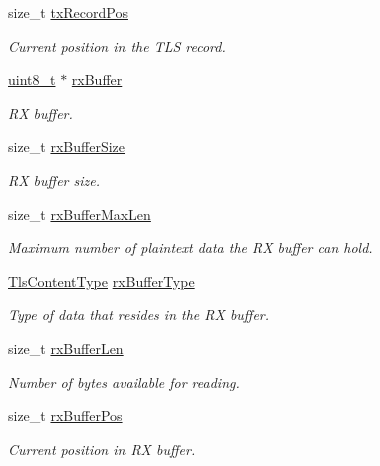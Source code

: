 \begin{DoxyCompactItemize}
size\+\_\+t \hyperlink{struct__TlsContext_ab7ad234fd1e14281299555df13bf787c}{tx\+Record\+Pos}
\begin{DoxyCompactList}\small\item\em Current position in the T\+LS record. \end{DoxyCompactList}\item 
\hyperlink{stdint_8h_aba7bc1797add20fe3efdf37ced1182c5}{uint8\+\_\+t} $\ast$ \hyperlink{struct__TlsContext_a1cc3036e7bb97879806414376e44eef1}{rx\+Buffer}
\begin{DoxyCompactList}\small\item\em RX buffer. \end{DoxyCompactList}\item 
size\+\_\+t \hyperlink{struct__TlsContext_aaa909ddf1e7397e6b1ac4d99b05a464a}{rx\+Buffer\+Size}
\begin{DoxyCompactList}\small\item\em RX buffer size. \end{DoxyCompactList}\item 
size\+\_\+t \hyperlink{struct__TlsContext_a8d229c7f4ae3e4a980d048449d75c903}{rx\+Buffer\+Max\+Len}
\begin{DoxyCompactList}\small\item\em Maximum number of plaintext data the RX buffer can hold. \end{DoxyCompactList}\item 
\hyperlink{tls_8h_a6fad1efb9f011dc3f76039976bef896c}{Tls\+Content\+Type} \hyperlink{struct__TlsContext_a93d1f18a3a97e9909cec2e78e8769946}{rx\+Buffer\+Type}
\begin{DoxyCompactList}\small\item\em Type of data that resides in the RX buffer. \end{DoxyCompactList}\item 
size\+\_\+t \hyperlink{struct__TlsContext_a66808b578adfdc49d2852bc4d426ec2f}{rx\+Buffer\+Len}
\begin{DoxyCompactList}\small\item\em Number of bytes available for reading. \end{DoxyCompactList}\item 
size\+\_\+t \hyperlink{struct__TlsContext_ab671e4a19a6d90c0c3f8d36170ef63fc}{rx\+Buffer\+Pos}
\begin{DoxyCompactList}\small\item\em Current position in RX buffer. \end{DoxyCompactList}\item 

\end{DoxyCompactItemize}
